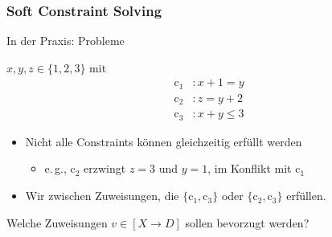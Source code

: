 \begin{frame}
\frametitle{Soft Constraint Solving}

\vspace*{1ex}

In der Praxis:  Probleme

\vspace*{2ex}

$x, y, z \in \{1,2,3\}$ mit 
\bgroup{}
\begin{align*}
  \mathrm{c}_1 &: x + 1 = y
\\[-.4ex]
  \mathrm{c}_2 &: z = y + 2
\\[-.4ex]
  \mathrm{c}_3 &: x + y \leq 3
\end{align*}
\egroup

\begin{itemize}
  \item Nicht alle Constraints können gleichzeitig erfüllt werden
\begin{itemize} \pause
  \item e.\,g., $\mathrm{c}_2$ erzwingt $z = 3$ und $y = 1$, im Konflikt mit $\mathrm{c}_1$
\end{itemize}

  \item Wir  zwischen Zuweisungen, die $\{ \mathrm{c}_1, \mathrm{c}_3 \}$ oder $\{ \mathrm{c}_2, \mathrm{c}_3 \}$ erfüllen.
\end{itemize}

\vspace*{2ex}

Welche Zuweisungen $v \in [X \to D]$ sollen \alert{bevorzugt} werden?

\end{frame}

